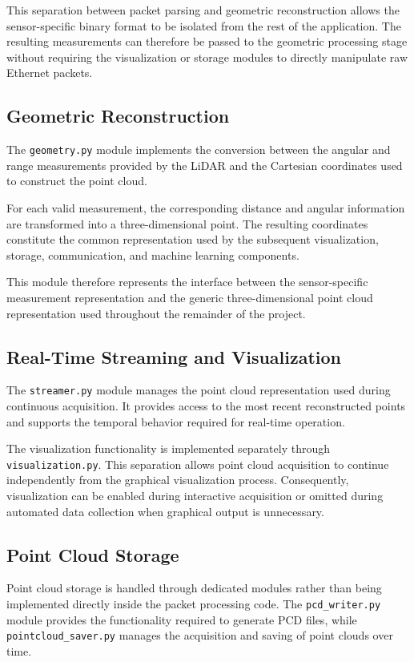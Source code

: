 This separation between packet parsing and geometric reconstruction allows the sensor-specific binary format to be isolated from the rest of the application. The resulting measurements can therefore be passed to the geometric processing stage without requiring the visualization or storage modules to directly manipulate raw Ethernet packets.

\subsection{Geometric Reconstruction}

The \texttt{geometry.py} module implements the conversion between the angular and range measurements provided by the LiDAR and the Cartesian coordinates used to construct the point cloud.

For each valid measurement, the corresponding distance and angular information are transformed into a three-dimensional point. The resulting coordinates constitute the common representation used by the subsequent visualization, storage, communication, and machine learning components.

This module therefore represents the interface between the sensor-specific measurement representation and the generic three-dimensional point cloud representation used throughout the remainder of the project.

\subsection{Real-Time Streaming and Visualization}

The \texttt{streamer.py} module manages the point cloud representation used during continuous acquisition. It provides access to the most recent reconstructed points and supports the temporal behavior required for real-time operation.

The visualization functionality is implemented separately through \texttt{visualization.py}. This separation allows point cloud acquisition to continue independently from the graphical visualization process. Consequently, visualization can be enabled during interactive acquisition or omitted during automated data collection when graphical output is unnecessary.

\subsection{Point Cloud Storage}

Point cloud storage is handled through dedicated modules rather than being implemented directly inside the packet processing code. The \texttt{pcd\_writer.py} module provides the functionality required to generate PCD files, while \texttt{pointcloud\_saver.py} manages the acquisition and saving of point clouds over time.

